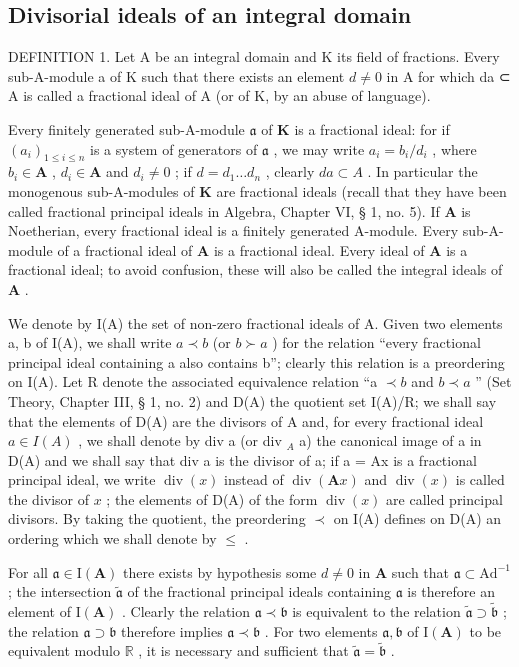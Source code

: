 \subsection{Divisorial ideals of an integral domain}

DEFINITION 1. Let A be an integral domain and K its field of fractions. Every sub-A-module a of K such that there exists an element \(d \neq 0\) in A for which da ⊂ A is called a fractional ideal of A (or of K, by an abuse of language).

Every finitely generated sub-A-module \(\mathfrak{a}\) of \(\mathbf{K}\) is a fractional ideal: for if \((a_{i})_{1\leqslant i\leqslant n}\) is a system of generators of \(\mathfrak{a}\) , we may write \(a_{i} = b_{i} / d_{i}\) , where \(b_{i}\in \mathbf{A}\) , \(d_{i}\in \mathbf{A}\) and \(d_{i}\neq 0\) ; if \(d = d_{1}\ldots d_{n}\) , clearly \(da\subset A\) . In particular the monogenous sub-A-modules of \(\mathbf{K}\) are fractional ideals (recall that they have been called fractional principal ideals in Algebra, Chapter VI, § 1, no. 5). If \(\mathbf{A}\) is Noetherian, every fractional ideal is a finitely generated A-module. Every sub-A-module of a fractional ideal of \(\mathbf{A}\) is a fractional ideal. Every ideal of \(\mathbf{A}\) is a fractional ideal; to avoid confusion, these will also be called the integral ideals of \(\mathbf{A}\) .

We denote by I(A) the set of non-zero fractional ideals of A. Given two elements a, b of I(A), we shall write \(a \prec b\) (or \(b \succ a\) ) for the relation ``every fractional principal ideal containing a also contains b''; clearly this relation is a preordering on I(A). Let R denote the associated equivalence relation ``a \(\prec b\) and \(b \prec a\) '' (Set Theory, Chapter III, § 1, no. 2) and D(A) the quotient set I(A)/R; we shall say that the elements of D(A) are the divisors of A and, for every fractional ideal \(a \in I(A)\) , we shall denote by div a (or div \(_{A}\) a) the canonical image of a in D(A) and we shall say that div a is the divisor of a; if a = Ax is a fractional principal ideal, we write \(\operatorname{div}(x)\) instead of \(\operatorname{div}(\mathbf{A}x)\) and \(\operatorname{div}(x)\) is called the divisor of \(x\) ; the elements of D(A) of the form \(\operatorname{div}(x)\) are called principal divisors. By taking the quotient, the preordering \(\prec\) on I(A) defines on D(A) an ordering which we shall denote by \(\leqslant\) .

For all \(\mathfrak{a} \in \mathrm{I}(\mathbf{A})\) there exists by hypothesis some \(d \neq 0\) in \(\mathbf{A}\) such that \(\mathfrak{a} \subset \mathrm{Ad}^{-1}\) ; the intersection \(\tilde{\mathfrak{a}}\) of the fractional principal ideals containing \(\mathfrak{a}\) is therefore an element of \(\mathrm{I}(\mathbf{A})\) . Clearly the relation \(\mathfrak{a} \prec \mathfrak{b}\) is equivalent to the relation \(\tilde{\mathfrak{a}} \supset \tilde{\mathfrak{b}}\) ; the relation \(\mathfrak{a} \supset \mathfrak{b}\) therefore implies \(\mathfrak{a} \prec \mathfrak{b}\) . For two elements \(\mathfrak{a}, \mathfrak{b}\) of \(\mathrm{I}(\mathbf{A})\) to be equivalent modulo \(\mathbb{R}\) , it is necessary and sufficient that \(\tilde{\mathfrak{a}} = \tilde{\mathfrak{b}}\) .

